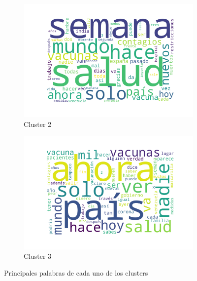 \begin{figure}
\begin{subfigure}[b]{0.49\textwidth}
        \includegraphics[width=\textwidth]{results/TopicDetection/es/cluster2.png}
        \caption{Cluster 2}
        \label{fig:es_c2}
    \end{subfigure}
    \hfill
    \begin{subfigure}[b]{0.49\textwidth}
        \centering
        \includegraphics[width=\textwidth]{results/TopicDetection/es/cluster3.png}
        \caption{Cluster 3}
        \label{fig:es_c3}
    \end{subfigure}
    \caption{Principales palabras de cada uno de los clusters}
    \label{fig:es_clusters}
\end{figure}

